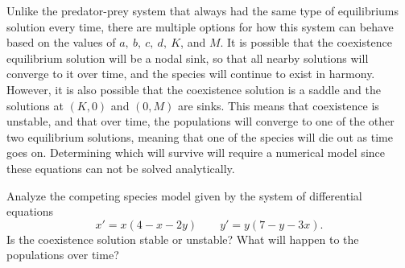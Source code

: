 \documentclass{ximera}
\begin{document}
Unlike the predator-prey system that always had the same type of equilibriums solution every time, there are multiple options for how this system can behave based on the values of $a,\ b,\ c,\ d,\ K$, and $M$. It is possible that the coexistence equilibrium solution will be a nodal sink, so that all nearby solutions will converge to it over time, and the species will continue to exist in harmony. However, it is also possible that the coexistence solution is a saddle and the solutions at $(K,0)$ and $(0,M)$ are sinks. This means that coexistence is unstable, and that over time, the populations will converge to one of the other two equilibrium solutions, meaning that one of the species will die out as time goes on. Determining which will survive will require a numerical model since these equations can not be solved analytically. 

\begin{example}
    Analyze the competing species model given by the system of differential equations
    \[ 
        x' = x(4-x-2y) \qquad y' = y(7 - y - 3x). 
    \] 
    Is the coexistence solution stable or unstable? What will happen to the populations over time?
\end{example}
\end{document}

